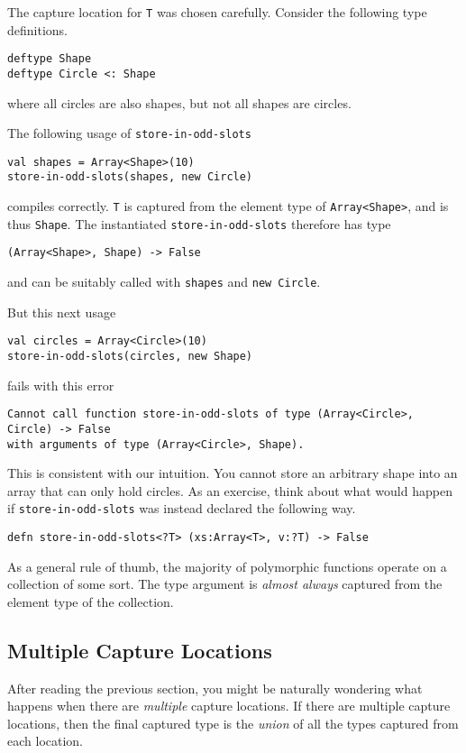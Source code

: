 \documentclass[10pt,oneside]{book}
\begin{document}
The capture location for \texttt{\frenchspacing T} was chosen carefully. Consider the following type definitions.
\begin{lstlisting}
deftype Shape
deftype Circle <: Shape
\end{lstlisting}
where all circles are also shapes, but not all shapes are circles. 

The following usage of \texttt{\frenchspacing store-in-odd-slots}
\begin{lstlisting}
val shapes = Array<Shape>(10)
store-in-odd-slots(shapes, new Circle)
\end{lstlisting}
compiles correctly. \texttt{\frenchspacing T} is captured from the element type of \texttt{\frenchspacing Array<Shape>}, and is thus \texttt{\frenchspacing Shape}. The instantiated \texttt{\frenchspacing store-in-odd-slots} therefore has type
\begin{lstlisting}
(Array<Shape>, Shape) -> False
\end{lstlisting}
and can be suitably called with \texttt{\frenchspacing shapes} and \texttt{\frenchspacing new Circle}.

But this next usage
\begin{lstlisting}
val circles = Array<Circle>(10)
store-in-odd-slots(circles, new Shape)
\end{lstlisting}
fails with this error
\begin{lstlisting}
Cannot call function store-in-odd-slots of type (Array<Circle>, Circle) -> False
with arguments of type (Array<Circle>, Shape).
\end{lstlisting}
This is consistent with our intuition. You cannot store an arbitrary shape into an array that can only hold circles. As an exercise, think about what would happen if \texttt{\frenchspacing store-in-odd-slots} was instead declared the following way.
\begin{lstlisting}
defn store-in-odd-slots<?T> (xs:Array<T>, v:?T) -> False
\end{lstlisting}

As a general rule of thumb, the majority of polymorphic functions operate on a collection of some sort. The type argument is {\em almost always} captured from the element type of the collection. 

\subsection*{Multiple Capture Locations}
After reading the previous section, you might be naturally wondering what happens when there are {\em multiple} capture locations. If there are multiple capture locations, then the final captured type is the {\em union} of all the types captured from each location.
\end{document}
